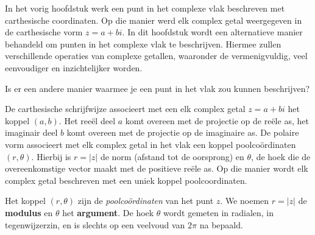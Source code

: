 \documentclass{ximera}
\begin{document}
    \author{Wiskunde Op Maat }
     
    \label{xim:complexe_getallen_polair}  %
 



In het vorig hoofdstuk werk een punt in het complexe vlak beschreven met carthesische coordinaten. Op die manier werd elk complex getal weergegeven in de carthesische vorm $z=a+bi$. In dit hoofdstuk wordt een alternatieve manier behandeld om punten in het complexe vlak te beschrijven. Hiermee zullen verschillende operaties van complexe getallen, waaronder de vermenigvuldig, veel eenvoudiger en inzichtelijker worden. 

\begin{quickquestion*}{}
    Is er een andere manier waarmee je een punt in het vlak zou kunnen beschrijven? 
\end{quickquestion*}




 

De carthesische schrijfwijze associeert met een elk complex getal $z=a+bi$ het koppel \((a, b)\). Het reeël deel \(a\) komt overeen met de projectie op de reële as, het imaginair deel \(b\) komt overeen met de projectie op de imaginaire as. De polaire vorm associeert met elk complex getal in het vlak een koppel poolcoördinaten \((r, \theta)\).  Hierbij is $r=|z|$ de norm (afstand tot de oorsprong) en $\theta$, de hoek die de overeenkomstige vector maakt met de positieve reële as. Op die manier wordt elk complex getal beschreven met een uniek koppel poolcoordinaten. 


\begin{definition}
    Het koppel $(r,\theta)$ zijn de \textit{poolcoördinaten} van het punt $z$. We noemen $r=|z|$ de \textbf{modulus} en $\theta$ het \textbf{argument}. De hoek $\theta$ wordt gemeten in radialen, in tegenwijzerzin, en is slechts op een veelvoud van $2\pi$ na bepaald.
\end{definition}


 
 
\end{document}
